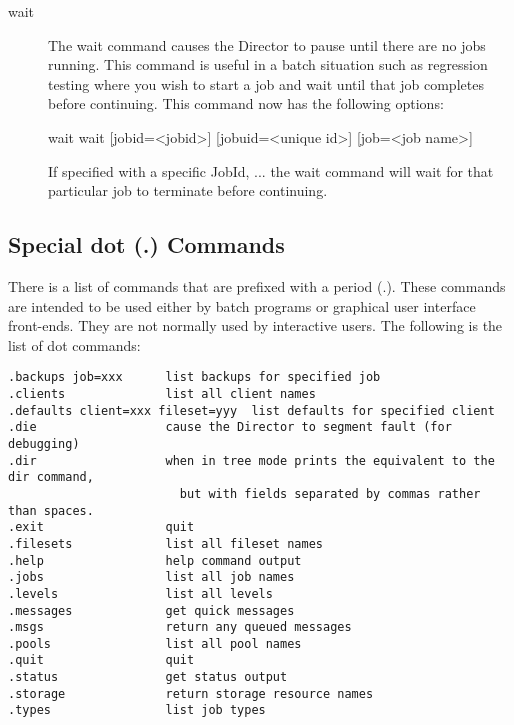 \begin{description}
\item [wait]
   The wait command causes the Director to pause  until there are no jobs
   running. This command is useful in  a batch situation such as regression
   testing where you  wish to start a job and wait until that job completes
   before continuing. This command now has the following options:

\begin{bconsole}{wait}
wait [jobid=<jobid>] [jobuid=<unique id>] [job=<job name>]
\end{bconsole}

   If specified with a specific JobId, ... the wait command will wait
   for that particular job to terminate before continuing.

\end{description}

\subsection{Special dot (.) Commands}
\label{dotcommands}

There is a list of commands that are prefixed with a period (.). These
commands are intended to be used either by batch programs or graphical user
interface front-ends. They are not normally used by interactive users.
The following
is the list of dot commands:

\footnotesize
\begin{verbatim}
.backups job=xxx      list backups for specified job
.clients              list all client names
.defaults client=xxx fileset=yyy  list defaults for specified client
.die                  cause the Director to segment fault (for debugging)
.dir                  when in tree mode prints the equivalent to the dir command,
                        but with fields separated by commas rather than spaces.
.exit                 quit
.filesets             list all fileset names
.help                 help command output
.jobs                 list all job names
.levels               list all levels
.messages             get quick messages
.msgs                 return any queued messages
.pools                list all pool names
.quit                 quit
.status               get status output
.storage              return storage resource names
.types                list job types
\end{verbatim}
\normalsize


